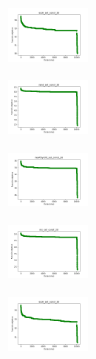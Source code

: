 \begin{figure}[H]
\begin{subfigure}
    \end{subfigure}
    \hfill
    \begin{subfigure}
        \centering
        \includegraphics[width=0.234\textwidth]{img/HS-LS/ecoli_set_const_20_589741062_cost.png}
    \end{subfigure}
    \hfill
    \begin{subfigure}
        \centering
        \includegraphics[width=0.234\textwidth]{img/HS-LS/rand_set_const_20_589741062_cost.png}
    \end{subfigure}
    \hfill
    \begin{subfigure}
        \centering
        \includegraphics[width=0.234\textwidth]{img/HS-LS/newthyroid_set_const_20_589741062_cost.png}
    \end{subfigure}
    \hfill
    \begin{subfigure}
        \centering
        \includegraphics[width=0.234\textwidth]{img/HS-LS/iris_set_const_20_277451237_cost.png}
    \end{subfigure}
    \hfill
    \begin{subfigure}
        \centering
        \includegraphics[width=0.234\textwidth]{img/HS-LS/ecoli_set_const_20_277451237_cost.png}
    \end{subfigure}
    \hfill

\end{figure}
